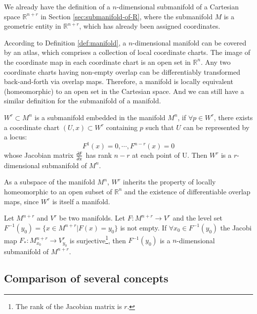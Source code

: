 \documentclass[11pt, a4paper]{book}
\begin{document}
We already have the definition of a $n$-dimensional submanifold of a Cartesian space
$\mathbb{R}^{n+r}$ in Section \ref{sec:submanifold-of-R}, where the submanifold $M$ is a
geometric entity in $\mathbb{R}^{n+r}$, which has already been assigned coordinates.

According to Definition \ref{def:manifold}, a $n$-dimensional manifold can be covered by
an atlas, which comprises a collection of local coordinate charts. The image of the
coordinate map in each coordinate chart is an open set in $\mathbb{R}^{n}$. Any two
coordinate charts having non-empty overlap can be differentiably transformed
back-and-forth via overlap maps. Therefore, a manifold is locally equivalent
(homeomorphic) to an open set in the Cartesian space. And we can still have a similar
definition for the submanifold of a manifold.

\begin{Definition}
  $W^r \subset M^n$ is a submanifold embedded in the manifold $M^n$, if
  $\forall p \in W^r$, there exists a coordinate chart $(U, x) \subset W^r$ containing $p$
  such that $U$ can be represented by a locus:
  $$
  F^1(x) = 0, \cdots, F^{n-r}(x) = 0
  $$
  whose Jacobian matrix $\frac{\partial F}{\partial x}$ has rank $n-r$ at each point of U.
  Then $W^r$ is a $r$-dimensional submanifold of $M^n$.
\end{Definition}

\begin{Remark}
  As a subspace of the manifold $M^n$, $W^r$ inherits the property of locally homeomorphic
  to an open subset of $\mathbb{R}^n$ and the existence of differentiable overlap maps,
  since $W^r$ is itself a manifold.
\end{Remark}

\begin{Theorem}
  Let $M^{n+r}$ and $V^r$ be two manifolds. Let $F: M^{n+r} \rightarrow V^r$ and the level
  set $F^{-1}(y_0) = \{x \in M^{n+r} \vert F(x) = y_0\}$ is not empty. If
  $\forall x_0 \in F^{-1}(y_0)$ the Jacobi map
  $F_{*}: M_{x_0}^{n+r} \rightarrow V_{y_0}^r$ is surjective\footnote{The rank of the
    Jacobian matrix is $r$.}, then $F^{-1}(y_0)$ is a $n$-dimensional submanifold of
  $M^{n+r}$.
\end{Theorem}

\subsection{Comparison of several concepts}
\end{document}
